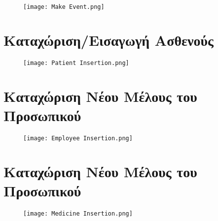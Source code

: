 \documentclass{article}
\begin{document}
\vspace{0.2cm}

\begin{figure}[!htb]
        \centering
        \texttt{[image: Make Event.png]}
\end{figure}

\newpage

\section{Καταχώριση/Εισαγωγή Ασθενούς}

\vspace{0.2cm}

\begin{figure}[!htb]
        \centering
        \texttt{[image: Patient Insertion.png]}
\end{figure}

\newpage

\section{Καταχώριση Νέου Μέλους του Προσωπικού}

\vspace{0.2cm}

\begin{figure}[!htb]
        \centering
        \texttt{[image: Employee Insertion.png]}
\end{figure}

\newpage

\section{Καταχώριση Νέου Μέλους του Προσωπικού}

\vspace{0.2cm}

\begin{figure}[!htb]
        \centering
        \texttt{[image: Medicine Insertion.png]}
\end{figure}
\end{document}
